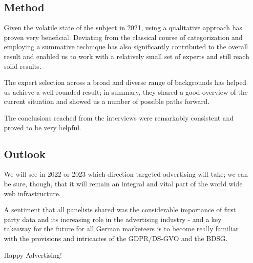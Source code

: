 \subsection{Method}

Given the volatile state of the subject in 2021, using a qualitative approach has proven very beneficial. Deviating from the classical course of categorization and employing a summative technique has also significantly contributed to the overall result and enabled us to work with a relatively small set of experts and still reach solid results.

The expert selection across a broad and diverse range of backgrounds has helped us achieve a well-rounded result; in summary, they shared a good overview of the current situation and showed us a number of possible paths forward.

The conclusions reached from the interviews were remarkably consistent and proved to be very helpful.

\subsection{Outlook}

We will see in 2022 or 2023 which direction targeted advertising will take; we can be sure, though, that it will remain an integral and vital part of the world wide web infrastructure.

A sentiment that all panelists shared was the considerable importance of first party data and its increasing role in the advertising industry - and a key takeaway for the future for all German marketeers is to become really familiar with the provisions and intricacies of the GDPR/DS-GVO and the BDSG.

\par\medskip

Happy Advertising!
